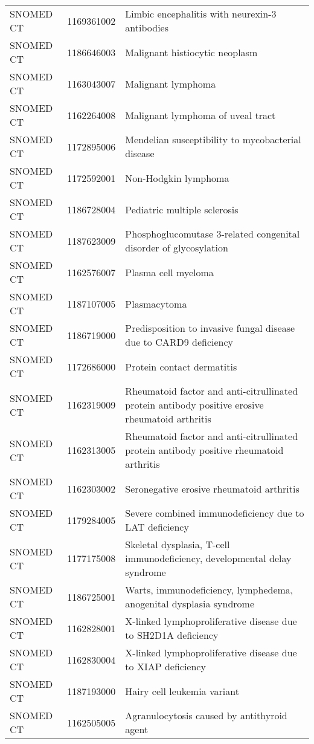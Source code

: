 \begin{longtable}{p{}p{}p{}}
  SNOMED CT & 1169361002 & Limbic encephalitis with neurexin-3 antibodies \\ 
  SNOMED CT & 1186646003 & Malignant histiocytic neoplasm \\ 
  SNOMED CT & 1163043007 & Malignant lymphoma \\ 
  SNOMED CT & 1162264008 & Malignant lymphoma of uveal tract \\ 
  SNOMED CT & 1172895006 & Mendelian susceptibility to mycobacterial disease \\ 
  SNOMED CT & 1172592001 & Non-Hodgkin lymphoma \\ 
  SNOMED CT & 1186728004 & Pediatric multiple sclerosis \\ 
  SNOMED CT & 1187623009 & Phosphoglucomutase 3-related congenital disorder of glycosylation \\ 
  SNOMED CT & 1162576007 & Plasma cell myeloma \\ 
  SNOMED CT & 1187107005 & Plasmacytoma \\ 
  SNOMED CT & 1186719000 & Predisposition to invasive fungal disease due to CARD9 deficiency \\ 
  SNOMED CT & 1172686000 & Protein contact dermatitis \\ 
  SNOMED CT & 1162319009 & Rheumatoid factor and anti-citrullinated protein antibody positive erosive rheumatoid arthritis \\ 
  SNOMED CT & 1162313005 & Rheumatoid factor and anti-citrullinated protein antibody positive rheumatoid arthritis \\ 
  SNOMED CT & 1162303002 & Seronegative erosive rheumatoid arthritis \\ 
  SNOMED CT & 1179284005 & Severe combined immunodeficiency due to LAT deficiency \\ 
  SNOMED CT & 1177175008 & Skeletal dysplasia, T-cell immunodeficiency, developmental delay syndrome \\ 
  SNOMED CT & 1186725001 & Warts, immunodeficiency, lymphedema, anogenital dysplasia syndrome \\ 
  SNOMED CT & 1162828001 & X-linked lymphoproliferative disease due to SH2D1A deficiency \\ 
  SNOMED CT & 1162830004 & X-linked lymphoproliferative disease due to XIAP deficiency \\ 
  SNOMED CT & 1187193000 & Hairy cell leukemia variant \\ 
  SNOMED CT & 1162505005 & Agranulocytosis caused by antithyroid agent \\ 

\end{longtable}

